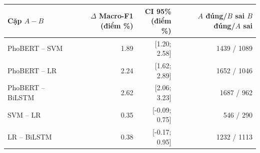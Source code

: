 \begin{tabular}{lrrr}\toprule
Cặp $A-B$ & \shortstack{$\Delta$ Macro-F1\\(điểm \%)} & \shortstack{CI 95\%\\(điểm \%)} & \shortstack{$A$ đúng/$B$ sai\\$B$ đúng/$A$ sai}\\\midrule
PhoBERT -- SVM & 1.89 & [1.20; 2.58] & 1439 / 1089\\
PhoBERT -- LR & 2.24 & [1.62; 2.89] & 1652 / 1046\\
PhoBERT -- BiLSTM & 2.62 & [2.06; 3.23] & 1687 / 962\\
SVM -- LR & 0.35 & [-0.09; 0.75] & 546 / 290\\
LR -- BiLSTM & 0.38 & [-0.17; 0.95] & 1232 / 1113\\
\bottomrule\end{tabular}
